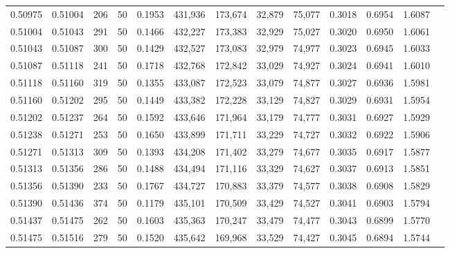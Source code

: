 \begin{tabular}{rrrrrrrrrrrrr}
0.50975 & 0.51004 &   206 &  50 &                                     0.1953 & 431,936 & 173,674 &  32,879 &  75,077 & 0.3018 & 0.6954 & 1.6087 \\
0.51004 & 0.51043 &   291 &  50 &                                     0.1466 & 432,227 & 173,383 &  32,929 &  75,027 & 0.3020 & 0.6950 & 1.6061 \\
0.51043 & 0.51087 &   300 &  50 &                                     0.1429 & 432,527 & 173,083 &  32,979 &  74,977 & 0.3023 & 0.6945 & 1.6033 \\
0.51087 & 0.51118 &   241 &  50 &                                     0.1718 & 432,768 & 172,842 &  33,029 &  74,927 & 0.3024 & 0.6941 & 1.6010 \\
0.51118 & 0.51160 &   319 &  50 &                                     0.1355 & 433,087 & 172,523 &  33,079 &  74,877 & 0.3027 & 0.6936 & 1.5981 \\
0.51160 & 0.51202 &   295 &  50 &                                     0.1449 & 433,382 & 172,228 &  33,129 &  74,827 & 0.3029 & 0.6931 & 1.5954 \\
0.51202 & 0.51237 &   264 &  50 &                                     0.1592 & 433,646 & 171,964 &  33,179 &  74,777 & 0.3031 & 0.6927 & 1.5929 \\
0.51238 & 0.51271 &   253 &  50 &                                     0.1650 & 433,899 & 171,711 &  33,229 &  74,727 & 0.3032 & 0.6922 & 1.5906 \\
0.51271 & 0.51313 &   309 &  50 &                                     0.1393 & 434,208 & 171,402 &  33,279 &  74,677 & 0.3035 & 0.6917 & 1.5877 \\
0.51313 & 0.51356 &   286 &  50 &                                     0.1488 & 434,494 & 171,116 &  33,329 &  74,627 & 0.3037 & 0.6913 & 1.5851 \\
0.51356 & 0.51390 &   233 &  50 &                                     0.1767 & 434,727 & 170,883 &  33,379 &  74,577 & 0.3038 & 0.6908 & 1.5829 \\
0.51390 & 0.51436 &   374 &  50 &                                     0.1179 & 435,101 & 170,509 &  33,429 &  74,527 & 0.3041 & 0.6903 & 1.5794 \\
0.51437 & 0.51475 &   262 &  50 &                                     0.1603 & 435,363 & 170,247 &  33,479 &  74,477 & 0.3043 & 0.6899 & 1.5770 \\
0.51475 & 0.51516 &   279 &  50 &                                     0.1520 & 435,642 & 169,968 &  33,529 &  74,427 & 0.3045 & 0.6894 & 1.5744 \\

\end{tabular}
